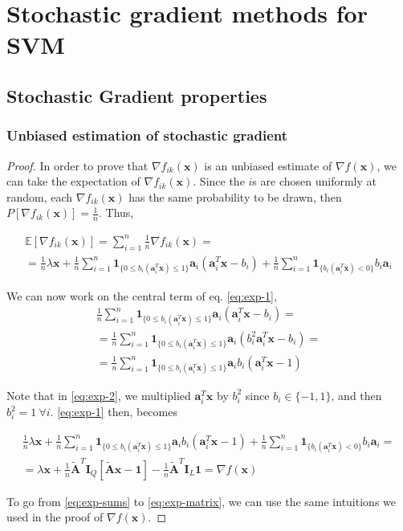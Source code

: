 \documentclass[12pt]{article}
\newcommand{\xb}{\mathbf{x}}
\newcommand{\ab}{\mathbf{a}}
\newcommand{\abi}{\ab_i}
\newcommand{\sumin}{\sum_{i = 1}^n}
\newcommand{\ax}{\abi^T\xb}
\newcommand{\atilde}{\mathbf{\tilde{A}}}
\newcommand{\id}{\mathbf{I}}
\newcommand{\ones}{\mathbf{1}}
\newcommand{\gradik}{\nabla f_{ik}}
\newcommand{\fracn}{\frac{1}{n}}
\newcommand{\linearpred}{b_i(\ax) < 0}
\newcommand{\quadrpred}{0 \leq b_i(\ax) \leq 1}
\newcommand{\linearone}{\ones_{\{\linearpred\}}}
\newcommand{\quadrone}{\ones_{\{\quadrpred\}}}
\begin{document}
\section{Stochastic gradient methods for SVM}

\subsection*{Stochastic Gradient properties}
\subsubsection*{Unbiased estimation of stochastic gradient}

\begin{proof}

In order to prove that $\gradik(\xb)$ is an unbiased estimate of $\nabla f(\xb)$, we can take the expectation of $\gradik(\xb)$. Since the $i$s are chosen uniformly at random, each $\gradik(\xb)$ has the same probability to be drawn, then $P[\gradik(\xb)] = \fracn$. Thus,

\begin{gather}
    \mathbb{E}[\gradik(\xb)] = \sumin \fracn \gradik(\xb) = \nonumber \\
    = \fracn\lambda\xb + \fracn \sumin \quadrone \ab_i(\abi^T\xb - b_i) + \fracn \sumin \linearone b_i \abi \label{eq:exp-1}
\end{gather}

We can now work on the central term of eq. \eqref{eq:exp-1}, 
\begin{gather}
    \fracn \sumin \quadrone \ab_i(\abi^T\xb - b_i) = \nonumber \\
    = \fracn \sumin \quadrone \ab_i(b_i^2\abi^T\xb - b_i) = \label{eq:exp-2} \\
    = \fracn \sumin \quadrone \ab_i b_i(\abi^T\xb - 1)
\end{gather}

Note that in \eqref{eq:exp-2}, we multiplied $\abi^T\xb$ by $b_i^2$ since $b_i \in \{-1, 1\}$, and then $b_i^2 = 1 \ \forall i$. \eqref{eq:exp-1} then, becomes

\begin{gather}
    \fracn\lambda\xb + \fracn \sumin \quadrone \ab_i b_i(\abi^T\xb - 1) + \fracn \sumin \linearone b_i \abi = \label{eq:exp-sums} \\
    = \lambda\xb + \fracn\atilde^T\id_Q[\atilde \xb - \ones] - \fracn\atilde^T\id_L\ones = \nabla f(\xb) \label{eq:exp-matrix}
\end{gather}

To go from \eqref{eq:exp-sums} to \eqref{eq:exp-matrix}, we can use the same intuitions we used in the proof of $\nabla f(\xb)$.

\end{proof}
\end{document}
